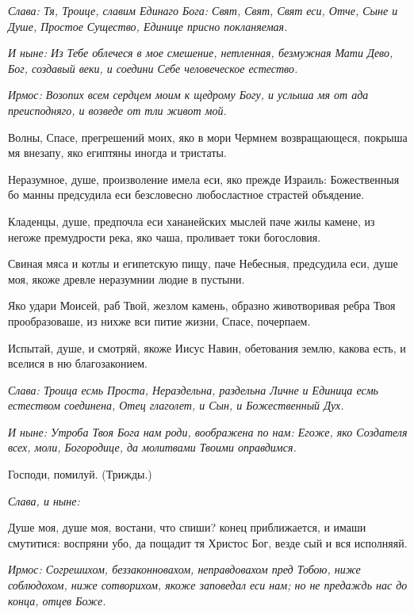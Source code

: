 \itshape Слава\normalfont{}: Тя, Троице, славим Единаго Бога: Свят, Свят, Свят еси, Отче, Сыне и Душе, Простое Существо, Единице присно покланяемая. 

\itshape И ныне\normalfont{}: Из Тебе облечеся в мое смешение, нетленная, безмужная Мати Дево, Бог, создавый веки, и соедини Себе человеческое естество. 


\itshape Ирмос\normalfont{}: Возопих всем сердцем моим к щедрому Богу, и услыша мя от ада преисподняго, и возведе от тли живот мой. 

Волны, Спасе, прегрешений моих, яко в мори Чермнем возвращающеся, покрыша мя внезапу, яко египтяны иногда и тристаты. 

Неразумное, душе, произволение имела еси, яко прежде Израиль: Божественныя бо манны предсудила еси безсловесно любосластное страстей объядение. 

Кладенцы, душе, предпочла еси хананейских мыслей паче жилы камене, из негоже премудрости река, яко чаша, проливает токи богословия. 

Свиная мяса и котлы и египетскую пищу, паче Небесныя, предсудила еси, душе моя, якоже древле неразумнии людие в пустыни. 

Яко удари Моисей, раб Твой, жезлом камень, образно животворивая ребра Твоя прообразоваше, из нихже вси питие жизни, Спасе, почерпаем. 

Испытай, душе, и смотряй, якоже Иисус Навин, обетования землю, какова есть, и вселися в ню благозаконием. 

\itshape Слава\normalfont{}: Троица есмь Проста, Нераздельна, раздельна Личне и Единица есмь естеством соединена, Отец глаголет, и Сын, и Божественный Дух. 

\itshape И ныне\normalfont{}: Утроба Твоя Бога нам роди, воображена по нам: Егоже, яко Создателя всех, моли, Богородице, да молитвами Твоими оправдимся. 

Господи, помилуй. (Трижды.) 

\itshape Слава, и ныне\normalfont{}: 


Душе моя, душе моя, востани, что спиши? конец приближается, и имаши смутитися: воспряни убо, да пощадит тя Христос Бог, везде сый и вся исполняяй. 


\itshape Ирмос\normalfont{}: Согрешихом, беззаконновахом, неправдовахом пред Тобою, ниже соблюдохом, ниже сотворихом, якоже заповедал еси нам; но не предаждь нас до конца, отцев Боже. 

